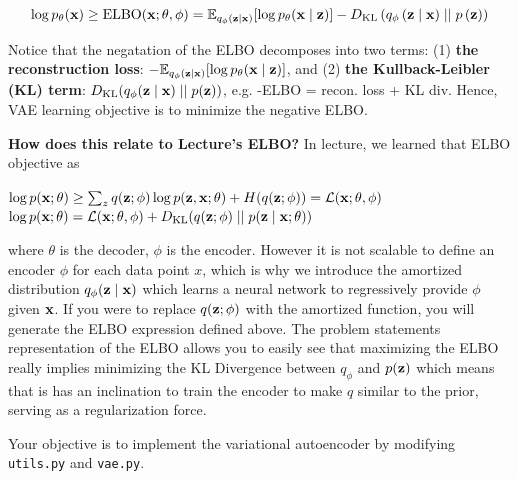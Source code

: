 \begin{equation} \label{eq:4}
    \log p_{\theta}(\mathbf{x}) \ge \text{ELBO}(\mathbf{x}; \theta, \phi) = \mathbb{E}_{q_{\phi}(\mathbf{z} \mid \mathbf{x})} [\log p_{\theta}(\mathbf{x} \mid \mathbf{z})] - D_{\text{KL}}\left(q_{\phi}\left(\mathbf{z} \mid \mathbf{x}\right) \mid\mid p\left(\mathbf{z}\right)\right)
\end{equation}

Notice that the negatation of the ELBO decomposes into two terms: (1) \textbf{the reconstruction loss}: $- \mathbb{E}_{q_{\phi}(\mathbf{z} \mid \mathbf{x})}[\log p_{\theta}(\mathbf{x} \mid \mathbf{z})]$, and 
(2) \textbf{the Kullback-Leibler (KL) term}: $D_{\text{KL}} (q_{\phi}(\mathbf{z} \mid \mathbf{x}) \mid\mid p(\mathbf{z}))$, e.g. -ELBO = recon. loss + KL div. Hence,
VAE learning objective is to minimize the negative ELBO.

\textbf{How does this relate to Lecture's ELBO?} In lecture, we learned that ELBO objective as 
\begin{center}
    $\log p(\mathbf{x}; \theta) \ge \sum_{z}q(\mathbf{z}; \phi) \log p(\mathbf{z}, \mathbf{x}; \theta) + H(q(\mathbf{z}; \phi)) = \mathcal{L}(\mathbf{x}; \theta, \phi)$ \\
    $\log p(\mathbf{x}; \theta) = \mathcal{L}(\mathbf{x}; \theta, \phi) + D_{\text{KL}}(q(\mathbf{z}; \phi) \mid\mid p(\mathbf{z} \mid \mathbf{x}; \theta))$
\end{center}

where $\theta$ is the decoder, $\phi$ is the encoder. However it is not scalable to define an encoder $\phi$ for each data point $x$,
which is why we introduce the amortized distribution $q_{\phi}(\mathbf{z} \mid \mathbf{x})$ which learns a neural network to regressively provide $\phi$
given $\mathbf{x}$. If you were to replace $q(\mathbf{z}; \phi)$ with the amortized function, you will generate the ELBO expression defined above. The problem statements
representation of the ELBO allows you to easily see that maximizing the ELBO really implies minimizing the KL Divergence between $q_{\phi}$ and $p(\mathbf{z})$
which means that is has an inclination to train the encoder to make $q$ similar to the prior, serving as a regularization force.  

Your objective is to implement the variational autoencoder by modifying \texttt{utils.py} and \texttt{vae.py}.

